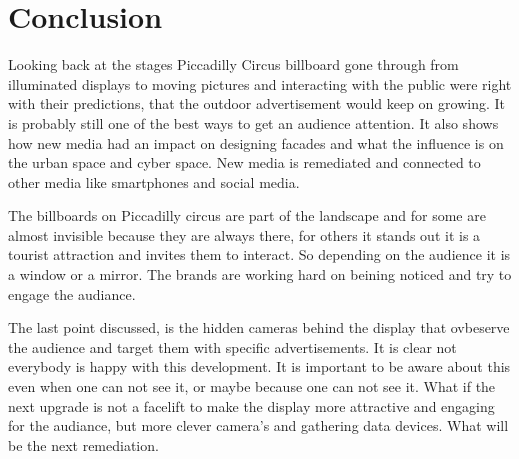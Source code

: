 \documentclass[a4paper, 11pt]{article}
\begin{document}
\section{Conclusion}

Looking back at the stages Piccadilly Circus billboard gone through from illuminated  displays to moving pictures and interacting with the public \cite{outdoor2009} were right with their predictions, that the outdoor advertisement would keep on growing. It is probably still one of the best ways to get an audience attention. It also shows how new media had an impact on designing facades and what the influence is on the urban space and cyber space. New media is remediated and connected to other media like smartphones and social media.

The billboards on Piccadilly circus are part of the landscape and for some are almost invisible because they are always there, for others it stands out it is a tourist attraction and invites them to interact. So depending on the audience it is a window or a mirror. The brands are working hard on beining noticed and try to engage the audiance.

The last point discussed, is the hidden cameras behind the display that ovbeserve the audience and target them with specific advertisements. It is clear not everybody is happy with this development. It is important to be aware about this even when one can not see it, or maybe because one can not see it. What if the next upgrade is not a facelift to make the display more attractive and engaging for the audiance, but more clever camera's and gathering data devices. What will be the next remediation.



\renewcommand{\textbf}{}
\renewcommand{\bf}{}
{}
\end{document}
